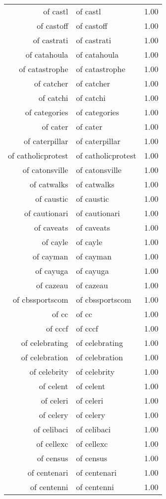 \begin{table}[ht]
\begin{tabular}{rlr}
  of castl & of castl & 1.00 \\ 
  of castoff & of castoff & 1.00 \\ 
  of castrati & of castrati & 1.00 \\ 
  of catahoula & of catahoula & 1.00 \\ 
  of catastrophe & of catastrophe & 1.00 \\ 
  of catcher & of catcher & 1.00 \\ 
  of catchi & of catchi & 1.00 \\ 
  of categories & of categories & 1.00 \\ 
  of cater & of cater & 1.00 \\ 
  of caterpillar & of caterpillar & 1.00 \\ 
  of catholicprotest & of catholicprotest & 1.00 \\ 
  of catonsville & of catonsville & 1.00 \\ 
  of catwalks & of catwalks & 1.00 \\ 
  of caustic & of caustic & 1.00 \\ 
  of cautionari & of cautionari & 1.00 \\ 
  of caveats & of caveats & 1.00 \\ 
  of cayle & of cayle & 1.00 \\ 
  of cayman & of cayman & 1.00 \\ 
  of cayuga & of cayuga & 1.00 \\ 
  of cazeau & of cazeau & 1.00 \\ 
  of cbssportscom & of cbssportscom & 1.00 \\ 
  of cc & of cc & 1.00 \\ 
  of cccf & of cccf & 1.00 \\ 
  of celebrating & of celebrating & 1.00 \\ 
  of celebration & of celebration & 1.00 \\ 
  of celebrity & of celebrity & 1.00 \\ 
  of celent & of celent & 1.00 \\ 
  of celeri & of celeri & 1.00 \\ 
  of celery & of celery & 1.00 \\ 
  of celibaci & of celibaci & 1.00 \\ 
  of cellexc & of cellexc & 1.00 \\ 
  of census & of census & 1.00 \\ 
  of centenari & of centenari & 1.00 \\ 
  of centenni & of centenni & 1.00 \\ 

\end{tabular}
\end{table}
